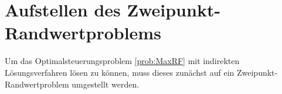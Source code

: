%
%
%

















\section{Aufstellen des Zweipunkt-Randwertproblems}\label{kap:ZPRand}
Um das Optimalsteuerungsproblem \ref{prob:MaxRF} mit indirekten Lösungsverfahren lösen zu können, muss dieses zunächst auf ein Zweipunkt-Randwertproblem \cite{Gerdts2011} umgestellt werden.

